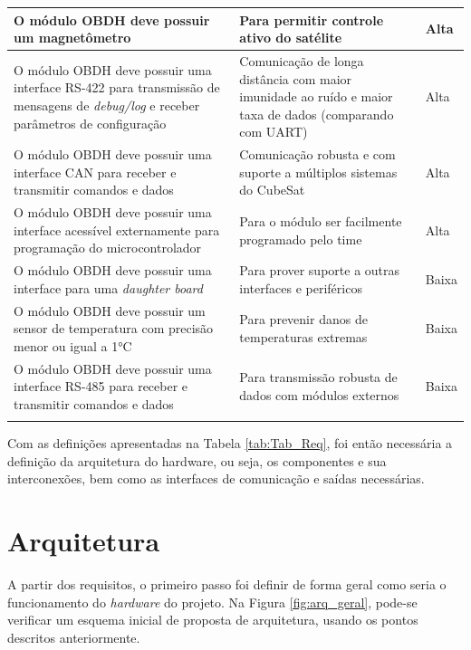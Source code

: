 \begin{longtable}{@{}p{5cm}p{5cm}p{3.5cm}@{}}
       \hline
        O módulo OBDH deve possuir um magnetômetro & Para permitir controle ativo do satélite  & Alta \tabularnewline

        \hline
        O módulo OBDH deve possuir uma interface RS-422 para transmissão de mensagens de \textit{debug/log} e receber parâmetros de configuração & Comunicação de longa distância com maior imunidade ao ruído e maior taxa de dados (comparando com UART)  & Alta \tabularnewline

       \hline
        O módulo OBDH deve possuir uma interface CAN para receber e transmitir comandos e dados & Comunicação robusta e com suporte a múltiplos sistemas do CubeSat  & Alta\tabularnewline

        \hline
        O módulo OBDH deve possuir uma interface acessível externamente para programação do microcontrolador & Para o módulo ser facilmente programado pelo time  & Alta \tabularnewline

        \hline
        O módulo OBDH deve possuir uma interface para uma \textit{daughter board} & Para prover suporte a outras interfaces e periféricos  & Baixa \tabularnewline

        \hline
        O módulo OBDH deve possuir um sensor de temperatura com precisão menor ou igual a 1°C & Para prevenir danos de temperaturas extremas & Baixa\tabularnewline

        \hline
        O módulo OBDH deve possuir uma interface RS-485 para receber e transmitir comandos e dados  & Para transmissão robusta de dados com módulos externos & Baixa \tabularnewline
       \hline
	\centering{\fonte{Elaboração própria.}}
\end{longtable}

Com as definições apresentadas na Tabela \ref{tab:Tab_Req}, foi então necessária a definição da arquitetura do hardware, ou seja, os componentes e sua interconexões, bem como as interfaces de comunicação e saídas necessárias.

\section{Arquitetura}

A partir dos requisitos, o primeiro passo foi definir de forma geral como seria o funcionamento do \textit{hardware} do projeto. Na Figura \ref{fig:arq_geral}, pode-se verificar um esquema inicial de proposta de arquitetura, usando os pontos descritos anteriormente.

